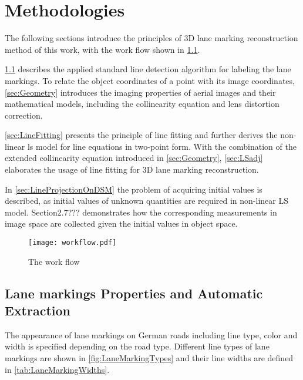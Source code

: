 
\chapter{Methodologies}
\label{chap:k2}

The following sections introduce the principles of 3D lane marking reconstruction method of this work, with the work flow shown in \cref{fig:FlowChart}.

\cref{sec:LineExtraction} describes the applied standard line detection algorithm for labeling the lane markings. To relate the object coordinates of a point with its image coordinates, \cref{sec:Geometry} introduces the imaging properties of aerial images and their mathematical models, including the collinearity equation and lens distortion correction.

\cref{sec:LineFitting} presents the principle of line fitting and further derives the non-linear \gls{ls} model for line equations in two-point form. With the combination of the extended collinearity equation introduced in \cref{sec:Geometry}, \cref{sec:LSadj} elaborates the usage of line fitting for 3D lane marking reconstruction.%

In \cref{sec:LineProjectionOnDSM} the problem of acquiring initial values is described, as initial values of unknown quantities are required in non-linear LS model. Section2.7??? demonstrates how the corresponding measurements in image space are collected given the initial values in object space.

\begin{figure}
  \centering
  \texttt{[image: workflow.pdf]}
  \caption{\small The work flow}
  \label{fig:FlowChart}
\end{figure}

\clearpage


\section{Lane markings Properties and Automatic Extraction}
\label{sec:LineExtraction}
The appearance of lane markings on German roads including line type, color and width is specified depending on the road type. Different line types of lane markings are shown in \cref{fig:LaneMarkingTypes} and their line widths are defined in \cref{tab:LaneMarkingWidths}.

